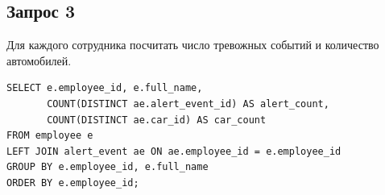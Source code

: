
\newpage


\subsection{Запрос 3}
Для каждого сотрудника посчитать число тревожных событий и количество автомобилей.
\begin{lstlisting}[style=sqlstyle, caption={Запрос 3}, label={lst:req3}]
SELECT e.employee_id, e.full_name,
       COUNT(DISTINCT ae.alert_event_id) AS alert_count,
       COUNT(DISTINCT ae.car_id) AS car_count
FROM employee e
LEFT JOIN alert_event ae ON ae.employee_id = e.employee_id
GROUP BY e.employee_id, e.full_name
ORDER BY e.employee_id;
\end{lstlisting}

